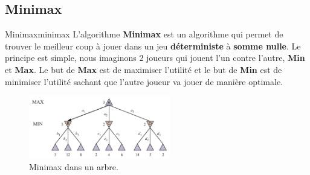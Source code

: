 \subsection{Minimax} %
\label{sub:minimax}

\begin{definition}{Minimax}{minimax}
    L'algorithme \textbf{Minimax} est un algorithme qui permet de trouver le meilleur coup à jouer dans un jeu \textbf{déterministe} à \textbf{somme nulle}.
    Le principe est simple, nous imaginons 2 joueurs qui jouent l'un contre l'autre, \textbf{Min} et \textbf{Max}.
    Le but de \textbf{Max} est de maximiser l'utilité et le but de \textbf{Min} est de minimiser l'utilité sachant 
    que l'autre joueur va jouer de manière optimale.
\end{definition}

\begin{figure}[H]
    \begin{center}
        \includegraphics[width=0.55\textwidth]{./pictures/minimax.png}
    \end{center}
    \caption{Minimax dans un arbre.}\label{fig:minimaxtree}
\end{figure}

